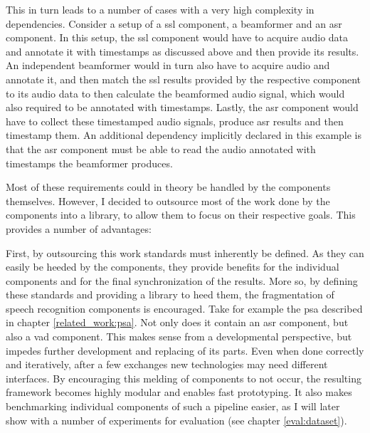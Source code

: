 This in turn leads to a number of cases with a very high complexity in dependencies.
Consider a setup of a \gls{ssl} component, a beamformer and an \gls{asr} component.
In this setup, the \gls{ssl} component would have to acquire audio data and annotate it with timestamps as discussed above and then provide its results.
An independent beamformer would in turn also have to acquire audio and annotate it, and then match the \gls{ssl} results provided by the respective component to its audio data to then calculate the beamformed audio signal, which would also required to be annotated with timestamps.
Lastly, the \gls{asr} component would have to collect these timestamped audio signals, produce \gls{asr} results and then timestamp them.
An additional dependency implicitly declared in this example is that the \gls{asr} component must be able to read the audio annotated with timestamps the beamformer produces.

Most of these requirements could in theory be handled by the components themselves.
However, I decided to outsource most of the work done by the components into a library, to allow them to focus on their respective goals.
This provides a number of advantages:

First, by outsourcing this work standards must inherently be defined.
As they can easily be heeded by the components, they provide benefits for the individual components and for the final synchronization of the results.
More so, by defining these standards and providing a library to heed them, the fragmentation of speech recognition components is encouraged. 
Take for example the \gls{psa} described in chapter \ref{related_work:psa}.
Not only does it contain an \gls{asr} component, but also a \gls{vad} component.
This makes sense from a developmental perspective, but impedes further development and replacing of its parts.
Even when done correctly and iteratively, after a few exchanges new technologies may need different interfaces.
By encouraging this melding of components to not occur, the resulting framework becomes highly modular and enables fast prototyping.
It also makes benchmarking individual components of such a pipeline easier, as I will later show with a number of experiments for evaluation (see chapter \ref{eval:dataset}).

